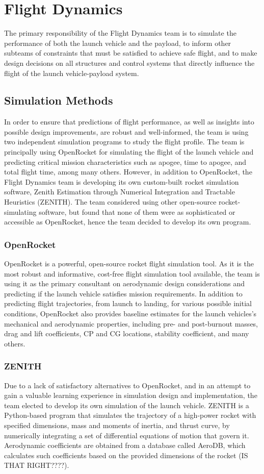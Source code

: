 \chapter{Flight Dynamics}
The primary responsibility of the Flight Dynamics team is to simulate the performance of both the launch vehicle and the payload, to inform other subteams of constraints that must be satisfied to achieve safe flight, and to make design decisions on all structures and control systems that directly influence the flight of the launch vehicle-payload system.

\section{Simulation Methods}
In order to ensure that predictions of flight performance, as well as insights into possible design improvements, are robust and well-informed, the team is using two independent simulation programs to study the flight profile. The team is principally using OpenRocket for simulating the flight of the launch vehicle and predicting critical mission characteristics such as apogee, time to apogee, and total flight time, among many others. However, in addition to OpenRocket, the Flight Dynamics team is developing its own custom-built rocket simulation software, Zenith Estimation through Numerical Integration and Tractable Heuristics (ZENITH). The team considered using other open-source rocket-simulating software, but found that none of them were as sophisticated or accessible as OpenRocket, hence the team decided to develop its own program.  

\subsection{OpenRocket}
OpenRocket is a powerful, open-source rocket flight simulation tool. As it is the most robust and informative, cost-free flight simulation tool available, the team is using it as the primary consultant on aerodynamic design considerations and predicting if the launch vehicle satisfies mission requirements. In addition to predicting flight trajectories, from launch to landing, for various possible initial conditions, OpenRocket also provides baseline estimates for the launch vehicles's mechanical and aerodynamic properties, including pre- and post-burnout masses, drag and lift coefficients, CP and CG locations, stability coefficient, and many others. 
\subsection{ZENITH}
Due to a lack of satisfactory alternatives to OpenRocket, and in an attempt to gain a valuable learning experience in simulation design and implementation, the team elected to develop its own simulation of the launch vehicle. ZENITH is a Python-based program that simulates the trajectory of a high-power rocket with specified dimensions, mass and moments of inertia, and thrust curve, by numerically integrating a set of differential equations of motion that govern it. Aerodynamic coefficients are obtained from a database called AeroDB, which calculates such coefficients based on the provided dimensions of the rocket (IS THAT RIGHT????).

